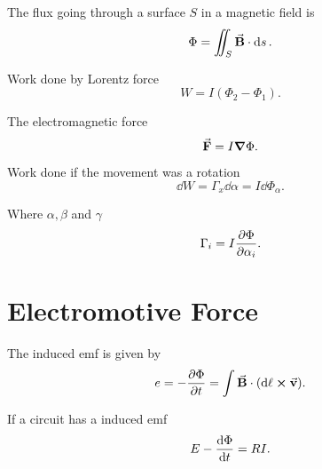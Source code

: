 The flux going through a surface $S$ in a magnetic field is
\[
	\Phi = \iint_S \va{B}\cdot\dd{s}
	.\]

Work done by Lorentz force
\[
	W = I(\Phi_2 - \Phi_1)
	.\]

The electromagnetic force
\[
	\va{F} = I \grad{\Phi}
	.\]

Work done if the movement was a rotation
\[
	\dd{W} = \Gamma_x\dd{\alpha} = I \dd{\Phi_\alpha}
	.\]

Where $\alpha, \beta$ and $\gamma$
\[
	\Gamma_i = I \pdv{\Phi}{\alpha_i}
	.\]

\section{Electromotive Force}
The induced emf is given by
\[
	e = -\pdv{\Phi}{t} = \int \va{B}\cdot(\dd{\ell}\cross\va{v})
	.\]

If a circuit has a induced emf
\[
	E-\dv{\Phi}{t} = RI
	.\]


